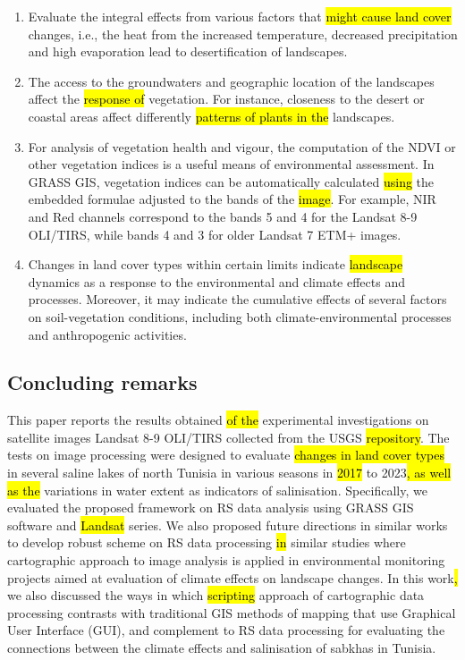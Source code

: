 \documentclass[land,article,submit,pdftex,moreauthors]{Definitions/mdpi}
\begin{document}
\begin{enumerate}
	\item Evaluate the integral effects from various factors that \hl{might cause land cover} changes, i.e., the heat from the increased temperature, decreased precipitation and high evaporation lead to desertification of landscapes. 
	\item The access to the groundwaters and geographic location of the landscapes affect the \hl{response of} vegetation. For instance, closeness to the desert or coastal areas affect differently\hl{ patterns of plants in the} landscapes. 
	\item For analysis of vegetation health and vigour, the computation of the NDVI or other vegetation indices is a useful means of environmental assessment. In GRASS GIS, vegetation indices can be automatically calculated \hl{using} the embedded formulae adjusted to the bands of the \hl{image}. For example, NIR and Red channels correspond to the bands 5 and 4 for the Landsat 8-9 OLI/TIRS, while bands 4 and 3 for older Landsat 7 ETM+ images.
	\item Changes in land cover types within certain limits indicate \hl{landscape} dynamics as a response to the environmental and climate effects and processes. Moreover, it may indicate the cumulative effects of several factors on soil-vegetation conditions, including both climate-environmental processes and anthropogenic activities.
\end{enumerate}

\subsection{Concluding remarks}

This paper reports the results obtained \hl{of the} experimental investigations on satellite images Landsat 8-9 OLI/TIRS collected from the USGS \hl{repository}. The tests on image processing were designed to evaluate\hl{ changes in land cover types} in several saline lakes of north Tunisia in various seasons in \hl{2017} to 2023\hl{, as well as the }variations in water extent as indicators of salinisation. Specifically, we evaluated the proposed framework on RS data analysis using GRASS GIS software and \hl{Landsat} series. We also proposed future directions in similar works to develop robust scheme on RS data processing\hl{ in} similar studies where cartographic approach to image analysis is applied in environmental monitoring projects aimed at evaluation of climate effects on landscape changes. In this work\hl{, }we also discussed the ways in which\hl{ scripting} approach of cartographic data processing contrasts with traditional GIS methods of mapping that use Graphical User Interface (GUI), and complement to RS data processing for evaluating the connections between the climate effects and salinisation of sabkhas in Tunisia. 
\end{document}
